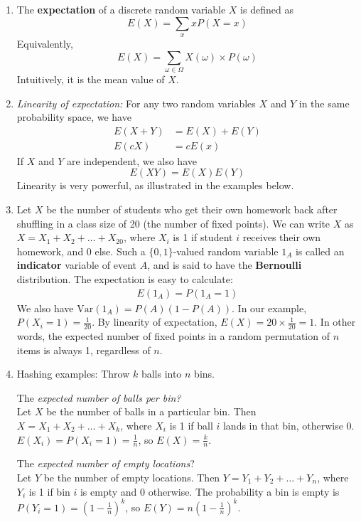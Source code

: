 \documentclass[10pt]{article}
\begin{document}
\begin{multicols}{2}
\begin{enumerate}
\begin{enumerate}
            \item The \textbf{expectation} of a discrete random variable $X$ is defined as 
            $$E(X) = \sum_{x} x P(X=x)$$
            Equivalently, 
            $$E(X) = \sum_{\omega \in \Omega} X(\omega) \times P(\omega)$$
            Intuitively, it is the mean value of $X$.
            \item \textit{Linearity of expectation:} For any two random variables $X$ and $Y$ in the same probability space, we have 
            \begin{align*}
                E(X+Y) &= E(X)+E(Y) \\
                E(cX) &= cE(x)
            \end{align*}  
            If $X$ and $Y$ are independent, we also have $$E(XY)=E(X)E(Y)$$ 
            Linearity is very powerful, as illustrated in the examples below.
            \item Let $X$ be the number of students who get their own homework back after shuffling in a class size of 20 (the number of fixed points). We can write $X$ as $X=X_1+X_2+\hdots+X_{20}$, where $X_i$ is 1 if student $i$ receives their own homework, and 0 else. Such a $\{0,1\}$-valued random variable $1_A$ is called an \textbf{indicator} variable of event $A$, and is said to have the \textbf{Bernoulli} distribution. The expectation is easy to calculate:
            \begin{align*}
                E(1_A) = P(1_A = 1)
            \end{align*}
            We also have $\text{Var}(1_A)=P(A)(1-P(A))$. In our example, $P(X_i=1) = \frac{1}{20}$. By linearity of expectation, $E(X) = 20 \times \frac{1}{20} = 1$. In other words, the expected number of fixed points in a random permutation of $n$ items is always 1, regardless of $n$. 
            \item Hashing examples: Throw $k$ balls into $n$ bins.
            
            
            The \textit{expected number of balls per bin?} \\ Let $X$ be the number of balls in a particular bin. Then $X=X_1+X_2+\ldots+X_k$, where $X_i$ is 1 if ball $i$ lands in that bin, otherwise 0. $E(X_i)=P(X_i=1)=\frac{1}{n}$, so $E(X)=\frac{k}{n}$.  
            
            The \textit{expected number of empty locations}? \\ Let $Y$ be the number of empty locations. Then $Y=Y_1+Y_2+\ldots+Y_n$, where $Y_i$ is 1 if bin $i$ is empty and 0 otherwise. The probability a bin is empty is $P(Y_i=1)=(1 - \frac{1}{n})^k$, so $E(Y)=n \left(1 - \frac{1}{n}\right)^k$.
            

\end{enumerate}
\end{enumerate}
\end{multicols}
\end{document}
